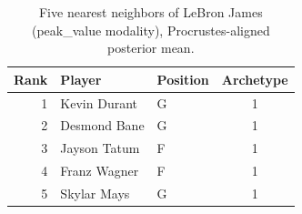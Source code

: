 \begin{table}[htbp]
  \centering\small
  \begin{tabular}{rllc}
    \toprule
    Rank & Player & Position & Archetype \\
    \midrule
    1 & Kevin Durant & G & 1 \\
    2 & Desmond Bane & G & 1 \\
    3 & Jayson Tatum & F & 1 \\
    4 & Franz Wagner & F & 1 \\
    5 & Skylar Mays & G & 1 \\
    \bottomrule
  \end{tabular}
  \caption{Five nearest neighbors of LeBron James (peak_value modality), Procrustes-aligned posterior mean.}
  \label{tab:LeBron_James_neighbors_peak_value}
\end{table}

